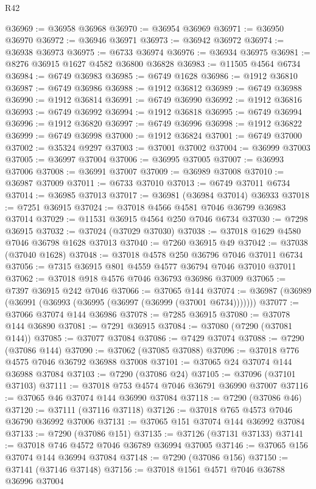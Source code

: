 \begin{lexlean}{R42}
\begin{coremodule}
{@36969 := @36958 @36968
@36970 := @36954 @36969
@36971 := @36950 @36970
@36972 := @36946 @36971
@36973 := @36942 @36972
@36974 := @36938 @36973
@36975 := @6733 @36974
@36976 := @36934 @36975
@36981 := @8276 @36915 @1627 @4582 @36800 @36828
@36983 := @11505 @4564 @6734
@36984 := @6749 @36983
@36985 := @6749 @1628
@36986 := @1912 @36810
@36987 := @6749 @36986
@36988 := @1912 @36812
@36989 := @6749 @36988
@36990 := @1912 @36814
@36991 := @6749 @36990
@36992 := @1912 @36816
@36993 := @6749 @36992
@36994 := @1912 @36818
@36995 := @6749 @36994
@36996 := @1912 @36820
@36997 := @6749 @36996
@36998 := @1912 @36822
@36999 := @6749 @36998
@37000 := @1912 @36824
@37001 := @6749 @37000
@37002 := @35324 @9297
@37003 := @37001 @37002
@37004 := @36999 @37003
@37005 := @36997 @37004
@37006 := @36995 @37005
@37007 := @36993 @37006
@37008 := @36991 @37007
@37009 := @36989 @37008
@37010 := @36987 @37009
@37011 := @6733 @37010
@37013 := @6749 @37011 @6734
@37014 := @36985 @37013
@37017 := @36981 (@36984 @37014) @36933
@37018 := @7251 @36915
@37024 := @37018 @4566 @4581 @7046 @36799 @36983 @37014
@37029 := @11531 @36915 @4564 @250 @7046 @6734
@37030 := @7298 @36915
@37032 := @37024 (@37029 @37030)
@37038 := @37018 @1629 @4580 @7046 @36798 @1628 @37013
@37040 := @7260 @36915 @49
@37042 := @37038 (@37040 @1628)
@37048 := @37018 @4578 @250 @36796 @7046 @37011 @6734
@37056 := @7315 @36915 @801 @4559 @4577 @36794 @7046 @37010 @37011
@37062 := @37018 @918 @4576 @7046 @36793 @36986 @37009
@37065 := @7397 @36915 @242 @7046
@37066 := @37065 @144
@37074 := @36987 (@36989 (@36991 (@36993 (@36995 (@36997 (@36999 (@37001 @6734)))))))
@37077 := @37066 @37074 @144 @36986
@37078 := @7285 @36915
@37080 := @37078 @144 @36890
@37081 := @7291 @36915
@37084 := @37080 (@7290 (@37081 @144))
@37085 := @37077 @37084
@37086 := @7429 @37074
@37088 := @7290 (@37086 @144)
@37090 := @37062 (@37085 @37088)
@37096 := @37018 @776 @4575 @7046 @36792 @36988 @37008
@37101 := @37065 @24 @37074 @144 @36988 @37084
@37103 := @7290 (@37086 @24)
@37105 := @37096 (@37101 @37103)
@37111 := @37018 @753 @4574 @7046 @36791 @36990 @37007
@37116 := @37065 @46 @37074 @144 @36990 @37084
@37118 := @7290 (@37086 @46)
@37120 := @37111 (@37116 @37118)
@37126 := @37018 @765 @4573 @7046 @36790 @36992 @37006
@37131 := @37065 @151 @37074 @144 @36992 @37084
@37133 := @7290 (@37086 @151)
@37135 := @37126 (@37131 @37133)
@37141 := @37018 @746 @4572 @7046 @36789 @36994 @37005
@37146 := @37065 @156 @37074 @144 @36994 @37084
@37148 := @7290 (@37086 @156)
@37150 := @37141 (@37146 @37148)
@37156 := @37018 @1561 @4571 @7046 @36788 @36996 @37004
}
\end{coremodule}
\end{lexlean}
